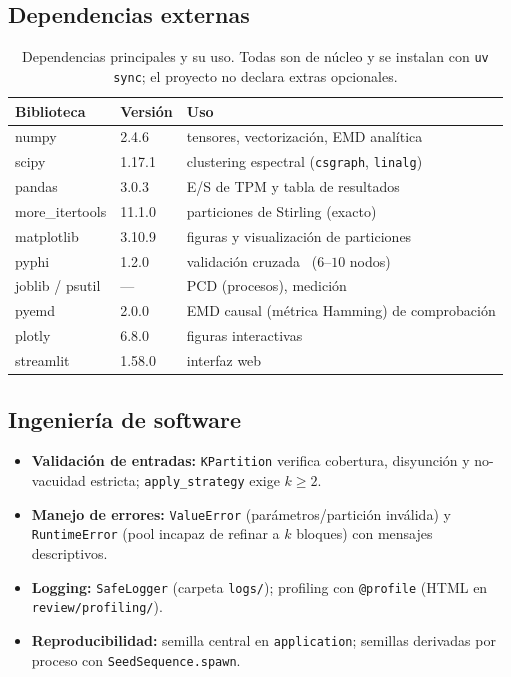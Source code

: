 \documentclass[11pt,letterpaper]{article}
\begin{document}
\subsection{Dependencias externas}
\begin{table}[H]
	\centering\footnotesize
	\caption{Dependencias principales y su uso. Todas son de núcleo y se instalan
		con \texttt{uv sync}; el proyecto no declara extras opcionales.}
	\begin{tabular}{@{}lll@{}}
		\toprule
		Biblioteca      & Versión & Uso                                                      \\
		\midrule
		numpy           & 2.4.6   & tensores, vectorización, EMD analítica                   \\
		scipy           & 1.17.1  & clustering espectral (\texttt{csgraph}, \texttt{linalg}) \\
		pandas          & 3.0.3   & E/S de TPM y tabla de resultados                         \\
		more\_itertools & 11.1.0  & particiones de Stirling (exacto)                         \\
		matplotlib      & 3.10.9  & figuras y visualización de particiones                   \\
		pyphi           & 1.2.0   & validación cruzada~\cite{pyphi} ($6$–$10$ nodos)         \\
		joblib / psutil & ---     & PCD (procesos), medición                                 \\
		pyemd           & 2.0.0   & EMD causal (métrica Hamming) de comprobación             \\
		plotly          & 6.8.0   & figuras interactivas                                     \\
		streamlit       & 1.58.0  & interfaz web                                             \\
		\bottomrule
	\end{tabular}
\end{table}

\subsection{Ingeniería de software}
\begin{itemize}
	\item \textbf{Validación de entradas:} \texttt{KPartition} verifica cobertura,
	      disyunción y no-vacuidad estricta; \texttt{apply\_strategy} exige $k\ge 2$.
	\item \textbf{Manejo de errores:} \texttt{ValueError} (parámetros/partición
	      inválida) y \texttt{RuntimeError} (pool incapaz de refinar a $k$ bloques) con
	      mensajes descriptivos.
	\item \textbf{Logging:} \texttt{SafeLogger} (carpeta \texttt{logs/}); profiling
	      con \texttt{@profile} (HTML en \texttt{review/profiling/}).
	\item \textbf{Reproducibilidad:} semilla central en \texttt{application};
	      semillas derivadas por proceso con \texttt{SeedSequence.spawn}.
\end{itemize}
\end{document}
